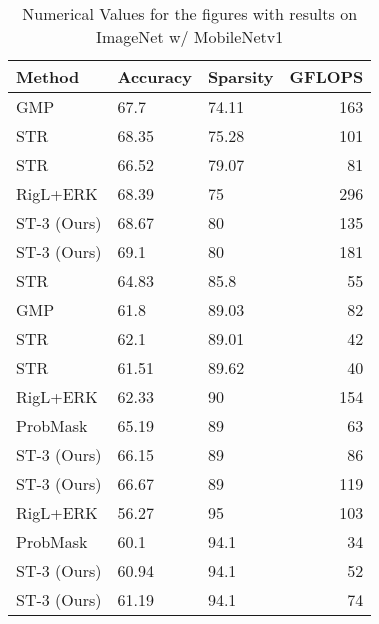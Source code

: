 \documentclass[10pt,twocolumn,letterpaper]{article}
\begin{document}
\begin{table}
  \begin{center}
    {\small{
\begin{tabular}{l|llr}
\toprule
Method & Accuracy  & Sparsity  & GFLOPS \\
\midrule
GMP & 67.7 & 74.11 & 163\\
STR & 68.35 & 75.28 & 101\\
STR & 66.52 & 79.07 & 81\\
RigL+ERK & 68.39 & 75 & 296 \\
ST-3 (Ours) &  68.67 & 80 & 135\\
ST-3 (Ours) & 69.1 & 80 & 181\\
\midrule
STR & 64.83 & 85.8 & 55 \\
GMP & 61.8 & 89.03 & 82\\
STR & 62.1 & 89.01 & 42\\
STR & 61.51 & 89.62 & 40\\
RigL+ERK & 62.33 & 90 & 154\\
ProbMask & 65.19 & 89 & 63\\
ST-3 (Ours) & 66.15 & 89 & 86 \\
ST-3 (Ours) & 66.67 & 89 & 119\\
\midrule
RigL+ERK & 56.27 & 95 & 103\\
ProbMask & 60.1 & 94.1 & 34\\
ST-3 (Ours) & 60.94 & 94.1 & 52\\
ST-3 (Ours) & 61.19 & 94.1 & 74\\

\bottomrule
\end{tabular}
}}
\end{center}
\caption{Numerical Values for the figures with results on ImageNet w/ MobileNetv1}\label{tab:mobile}
\end{table}
\end{document}
